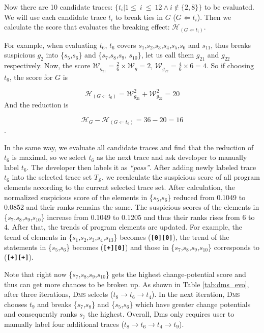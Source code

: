Now there are 10 candidate traces: $\{t_{i} | 1\leq~i~\leq~12 \wedge i\notin\{2,8\}\}$ to be evaluated. We will use each candidate trace $t_{i}$ to
break ties in $G$ ($G \Leftarrow t_{i}$). Then we calculate the score that evaluates the breaking effect: $\mathcal{H}_{(G \Leftarrow t_{i})}$.

For example, when evaluating $t_6$, $t_{6}$ covers $s_{1}$,$s_{2}$,$s_{3}$,$s_{4}$,$s_{5}$,$s_{6}$ and $s_{11}$, thus breaks suspicious $g_{2}$
into \{$s_{5}$,$s_{6}$\} and \{$s_{7}$,$s_{8}$,$s_{9}$, $s_{10}$\}, let us call them $g_{21}$ and $g_{22}$ respectively.
Now, the score $\mathcal{W}_{g_{21}} = \frac{2}{6} \times \mathcal{W}_{g} = 2$, $\mathcal{W}_{g_{22}} = \frac{4}{6} \times 6 = 4$.
So if choosing $t_{6}$, the score for $G$ is

\[\mathcal{H}_{(G \Leftarrow t_{6})} = \mathcal{W}_{g_{21}}^{2} + \mathcal{W}_{g_{22}}^{2} = 20\]
And the reduction is

\[\mathcal{H}_{G} - \mathcal{H}_{(G \Leftarrow t_{6})} = 36 - 20 = 16\].

In the same way, we evaluate all candidate traces and find that the reduction of $t_{6}$ is maximal, so we select $t_{6}$ as the next trace and ask developer to manually label $t_{6}$.
The developer then labels it as {\em ``pass''}.  After adding newly labeled trace $t_{6}$ into the selected trace set $T_{\mathcal{S}}$, we recalculate the suspicious score
of all program elements according to the current selected trace set. After calculation, the normalized suspicious score of the elements in \{$s_{5}$,$s_{6}$\} reduced from 0.1049 to 0.0852 and their ranks remains the same. The suspicious scores of
the elements in \{$s_{7}$,$s_{8}$,$s_{9}$,$s_{10}$\} increase from 0.1049 to 0.1205 and thus their ranks rises from 6 to 4. After that, the trends of program elements are updated. For example, the trend of elements in \{$s_{1}$,$s_{2}$,$s_{3}$,$s_{4}$,$s_{13}$\} becomes ({\bf\texttt{[0]}}{\bf\texttt{[0]}}), the trend
of the statements in \{$s_{5}$,$s_{6}$\} becomes ({\bf\texttt{[+]}}{\bf\texttt{[0]}}) and those in \{$s_{7}$,$s_{8}$,$s_{9}$,$s_{10}$\} corresponds to ({\bf\texttt{[+]}}{\bf\texttt{[+]}}).


Note that right now \{$s_{7}$,$s_{8}$,$s_{9}$,$s_{10}$\} gets the highest change-potential score and thus can get more chances to be broken up.
As shown in Table \ref{tab:dms_evo},
after three iterations,
\textsc{Dms} selects (\texttt{$t_{8}$}$\rightarrow$\texttt{$t_{6}$}$\rightarrow$\texttt{$t_{4}$}). In the next iteration, \textsc{Dms} chooses $t_{9}$ and breaks \{$s_{7}$,$s_{8}$\} and \{$s_{5}$,$s_{6}$\} which have greater change potentials and consequently ranks $s_7$ the highest. Overall, {\sc Dms} only requires user to manually label four additional traces (\texttt{$t_{8}$}$\rightarrow$\texttt{$t_{6}$}$\rightarrow$\texttt{$t_{4}$}$\rightarrow$\texttt{$t_{9}$}).

